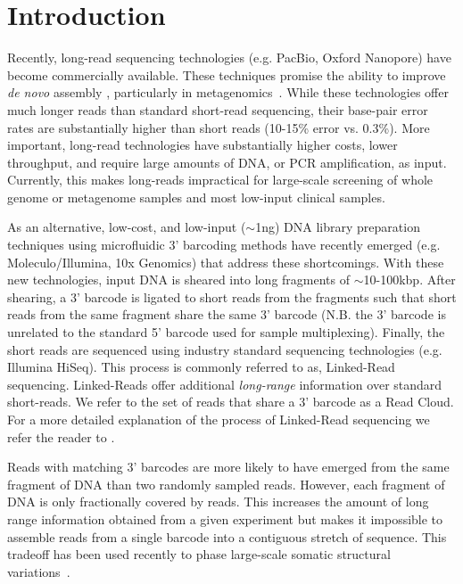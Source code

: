\section*{Introduction}

Recently, long-read sequencing technologies (e.g. PacBio, Oxford Nanopore) have become commercially available. These techniques promise the ability to improve {\it de novo} assembly \citep{Jain2017}, particularly in metagenomics~\citep{Frank2016}. While these technologies offer much longer reads than standard short-read sequencing, their base-pair error rates are substantially higher than short reads (10-15\% error vs. 0.3\%). More important, long-read technologies have substantially higher costs, lower throughput, and require large amounts of DNA, or PCR amplification, as input. Currently, this makes long-reads impractical for large-scale screening of whole genome or metagenome samples and most low-input clinical samples. 

As an alternative, low-cost, and low-input ($\sim$1ng) DNA library preparation techniques using microfluidic 3' barcoding methods have recently emerged (e.g. Moleculo/Illumina, 10x Genomics) that address these shortcomings. With these new technologies, input DNA is sheared into long fragments of $\sim$10-100kbp. After shearing, a 3' barcode is ligated to short reads from the fragments such that short reads from the same fragment share the same 3' barcode (N.B. the 3' barcode is unrelated to the standard 5' barcode used for sample multiplexing). Finally, the short reads are sequenced using industry standard sequencing technologies (e.g. Illumina HiSeq). This process is commonly referred to as, Linked-Read sequencing. Linked-Reads offer additional {\em long-range} information over standard short-reads. We refer to the set of reads that share a 3' barcode as a Read Cloud. For a more detailed explanation of the process of Linked-Read sequencing we refer the reader to \citep{Zheng2016}.

Reads with matching 3' barcodes are more likely to have emerged from the same fragment of DNA than two randomly sampled reads. However, each fragment of DNA is only fractionally covered by reads. This increases the amount of long range information obtained from a given experiment but makes it impossible to assemble reads from a single barcode into a contiguous stretch of sequence. This tradeoff has been used recently to phase large-scale somatic structural variations~\citep{Spies2017,Greer2017}. 

